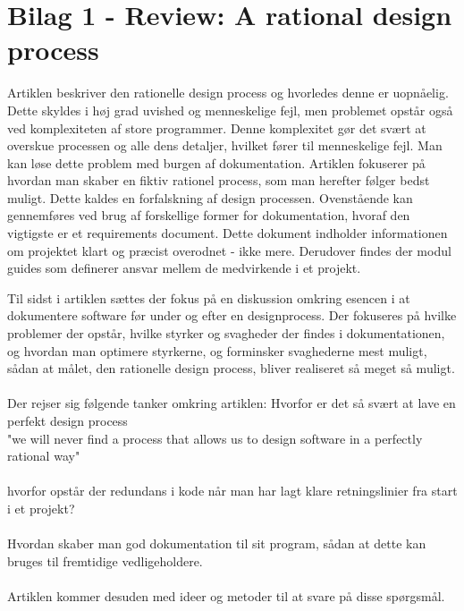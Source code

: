 \documentclass[a4paper,12pt]{article}
\begin{document}
\newpage
{}
\section{Bilag 1 - Review: A rational design process}
Artiklen beskriver den rationelle design process og hvorledes denne er uopnåelig. Dette skyldes i høj grad uvished og menneskelige fejl, men problemet opstår også ved komplexiteten af store programmer. Denne komplexitet gør det svært at overskue processen og alle dens detaljer, hvilket fører til menneskelige fejl. Man kan løse dette problem med burgen af dokumentation.
Artiklen fokuserer på hvordan man skaber en fiktiv rationel process, som man herefter følger bedst muligt.
Dette kaldes en forfalskning af design processen.
Ovenstående kan gennemføres ved brug af forskellige former for dokumentation, hvoraf den vigtigste er et
requirements document. Dette dokument indholder informationen om projektet klart og præcist overodnet - ikke mere.
Derudover findes der modul guides som definerer ansvar mellem de medvirkende i et projekt.

Til sidst i artiklen sættes der fokus på en diskussion omkring esencen i at dokumentere software før under og efter en designprocess. Der fokuseres på hvilke problemer der opstår, hvilke styrker og svagheder der findes i dokumentationen, og hvordan man optimere styrkerne, og forminsker svaghederne mest muligt, sådan at målet, den rationelle design process, bliver realiseret så meget så muligt.
\\
\\
Der rejser sig følgende tanker omkring artiklen:
Hvorfor er det så svært at lave en perfekt design process
\\
"we will never find a process that allows us to design software in a perfectly rational way"
\\
\\
hvorfor opstår der redundans i kode når man har lagt klare retningslinier fra start i et projekt?
\\
\\
Hvordan skaber man god dokumentation til sit program, sådan at dette kan bruges til fremtidige vedligeholdere.
\\
\\
Artiklen kommer desuden med ideer og metoder til at svare på disse spørgsmål.
\end{document}
